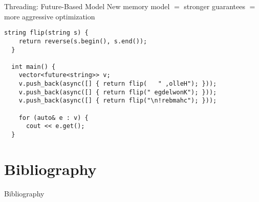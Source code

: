 \documentclass[svgnames,smaller]{beamer}
\newcommand*{\cpp}{\texttt{C++}}
\newcommand*{\csharp}{\texttt{C\#}}
\begin{document}
\begin{frame}[fragile]{Threading: Future-Based Model}
  New memory model \cite{mem-model} $=$ stronger guarantees $=$ more aggressive optimization
  \begin{lstlisting}[title={Taste of \cpp11 \cite{sutter-modern}}]
  string flip(string s) {
    return reverse(s.begin(), s.end());
  }

  int main() {
    vector<future<string>> v;
    v.push_back(async([] { return flip(   " ,olleH"); }));
    v.push_back(async([] { return flip(" egdelwonK"); }));
    v.push_back(async([] { return flip("\n!rebmahc"); }));

    for (auto& e : v) {
      cout << e.get();
  }
  \end{lstlisting}
\end{frame}

\section*{Bibliography}
\begin{frame}[allowframebreaks]{Bibliography}
\printbibliography
\end{frame}
\end{document}
